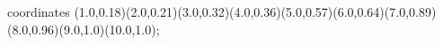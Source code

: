 					coordinates { (1.0,0.18)(2.0,0.21)(3.0,0.32)(4.0,0.36)(5.0,0.57)(6.0,0.64)(7.0,0.89)(8.0,0.96)(9.0,1.0)(10.0,1.0)};